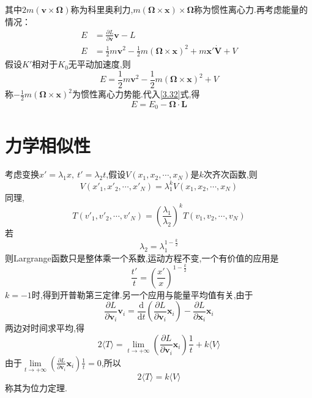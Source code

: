 其中$2m(\boldsymbol{v}\times\boldsymbol{\Omega})$称为科里奥利力,$m(\boldsymbol{\Omega}\times\boldsymbol{x})\times\boldsymbol{\Omega}$称为惯性离心力.再考虑能量的情况：
\begin{align}
E & = \frac{\partial L}{\partial\boldsymbol{v}}\boldsymbol{v} - L\\
E & = \frac{1}{2}m\boldsymbol{v}^2 - \frac{1}{2}m(\boldsymbol{\Omega}\times\boldsymbol{x})^2 + m\boldsymbol{x}'\boldsymbol{\dot{V}} + V
\end{align}
假设$K'$相对于$K_0$无平动加速度,则
\begin{equation}
E = \frac{1}{2}m\boldsymbol{v}^2 - \frac{1}{2}m(\boldsymbol{\Omega}\times\boldsymbol{x})^2 + V
\end{equation}
称$-\frac{1}{2}m(\boldsymbol{\Omega}\times\boldsymbol{x})^2$为惯性离心力势能.代入\eqref{3.32}式,得
\begin{equation}
E = E_0 - \boldsymbol{\Omega}\cdot\boldsymbol{L}
\end{equation}

\section{力学相似性}
考虑变换$x'=\lambda_1 x,\ t'=\lambda_2 t$,假设$V(x_1,x_2,\cdots,x_N)$是$k$次齐次函数,则
\begin{equation}
V(x'_1,x'_2,\cdots,x'_N) = \lambda_1^k V(x_1,x_2,\cdots,x_N)
\end{equation}
同理,
\begin{equation}
T(v'_1,v'_2,\cdots,v'_N) = \left(\frac{\lambda_1}{\lambda_2}\right)^k 
T(v_1,v_2,\cdots,v_N)
\end{equation}
若
\begin{equation}
\lambda_2 = \lambda_1^{1-\frac{k}{2}}
\end{equation}
则Largrange函数只是整体乘一个系数,运动方程不变,一个有价值的应用是
\begin{equation}
\frac{t'}{t} = \left(\frac{x'}{x}\right)^{1-\frac{k}{2}}
\end{equation}
$k=-1$时,得到开普勒第三定律.另一个应用与能量平均值有关,由于 %
\begin{equation}
\frac{\partial L}{\partial \boldsymbol{v}_i}\boldsymbol{v}_i = \frac{\mathrm{d}}{\mathrm{d}t}
\left(
\frac{\partial L}{\partial \boldsymbol{v}_i}\boldsymbol{x}_i
\right)
- \frac{\partial L}{\partial \boldsymbol{x}_i}\boldsymbol{x}_i
\end{equation}
两边对时间求平均,得
\begin{equation}
2\langle T \rangle = \lim_{t \rightarrow +\infty} \left(\frac{\partial L}{\partial \boldsymbol{v}_i}\boldsymbol{x}_i\right)\frac{1}{t} + k\langle V \rangle
\end{equation}
由于$\lim\limits_{t \rightarrow +\infty} \left(\frac{\partial L}{\partial \boldsymbol{v}_i}\boldsymbol{x}_i\right)\frac{1}{t} = 0$,所以
\begin{equation}
2\langle T \rangle = k\langle V \rangle
\end{equation}
称其为位力定理.

